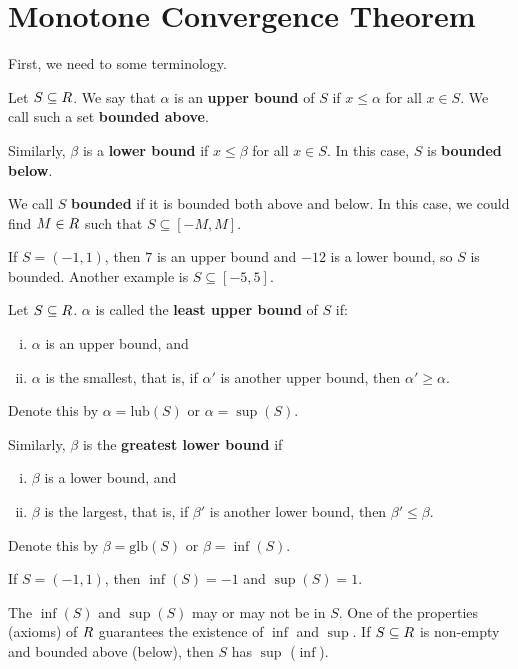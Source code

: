 \section{Monotone Convergence Theorem}
First, we need to some terminology.
\begin{Definition}{}{}
    Let $ S\subseteq \relax{R} $. We say that $ \alpha $ is an \textbf{upper bound}
    of $ S $ if $ x\le \alpha $ for all $ x\in S $. We call
    such a set \textbf{bounded above}.

    Similarly, $ \beta $ is a \textbf{lower bound} if $ x\le \beta $
    for all $ x\in S $. In this case, $ S $ is \textbf{bounded below}.

    We call $ S $ \textbf{bounded} if it is bounded both above and
    below. In this case, we could find $ M\in\relax{R} $
    such that $ S\subseteq [-M,M] $.
\end{Definition}
\begin{Example}{}{}
    If $ S=(-1,1) $, then $ 7 $ is an upper bound and $ -12 $
    is a lower bound, so $ S $ is bounded. Another example
    is $ S\subseteq[-5,5] $.
\end{Example}
\begin{Definition}{}{}
    Let $ S\subseteq \relax{R} $. $ \alpha $ is called the \textbf{least upper bound}
    of $ S $ if:
    \begin{enumerate}[(i)]
        \item $ \alpha $ is an upper bound, and
        \item $ \alpha $ is the smallest, that is, if $ \alpha' $ is another
              upper bound, then $ \alpha'\ge \alpha $.
    \end{enumerate}
    Denote this by $ \alpha=\text{lub}(S) $ or $ \alpha=\sup(S) $.

    Similarly, $ \beta $ is the \textbf{greatest lower bound} if
    \begin{enumerate}[(i)]
        \item $ \beta $ is a lower bound, and
        \item $ \beta $ is the largest, that is, if $ \beta' $
              is another lower bound, then $ \beta'\le \beta $.
    \end{enumerate}
    Denote this by $ \beta=\text{glb}(S) $ or $ \beta=\inf(S) $.
\end{Definition}
\begin{Example}{}{}
    If $ S=(-1,1) $, then $ \inf(S)=-1 $ and $ \sup(S)=1 $.
\end{Example}
\begin{Remark}{}{}
    The $ \inf(S) $ and $ \sup(S) $ may or may not be in $ S $.
    One of the properties (axioms) of $ \relax{R} $ guarantees the existence
    of $ \inf $ and $ \sup $. If $ S\subseteq \relax{R} $
    is non-empty and bounded above (below), then $ S $ has
    $ \sup $ ($ \inf $).
\end{Remark}
